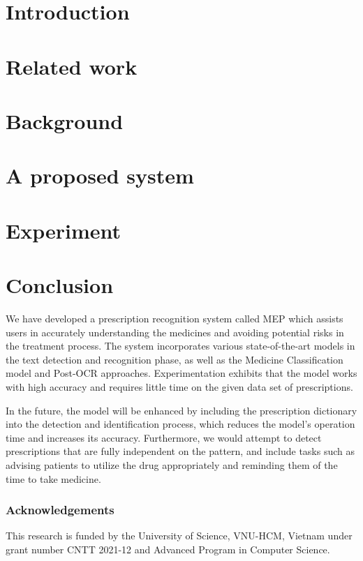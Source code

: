 \documentclass[runningheads]{llncs}
\begin{document}
\section{Introduction}

\section{Related work}

\section{Background}

\section{A proposed system}

\section{Experiment}

\section{Conclusion}
We have developed a prescription recognition system called MEP which assists users in accurately understanding the medicines and avoiding potential risks in the treatment process. The system incorporates various state-of-the-art models in the text detection and recognition phase, as well as the Medicine Classification model and Post-OCR approaches. Experimentation exhibits that the model works with high accuracy and requires little time on the given data set of prescriptions. %

In the future, the model will be enhanced by including the prescription dictionary into the detection and identification process, which reduces the model's operation time and increases its accuracy. Furthermore, we would attempt to detect prescriptions that are fully independent on the pattern, and include tasks such as advising patients to utilize the drug appropriately and reminding them of the time to take medicine. 


\subsubsection{Acknowledgements}
This research is funded by the University of Science, VNU-HCM, Vietnam under grant number CNTT 2021-12 and Advanced Program in Computer Science.

\printbibliography %
\end{document}
